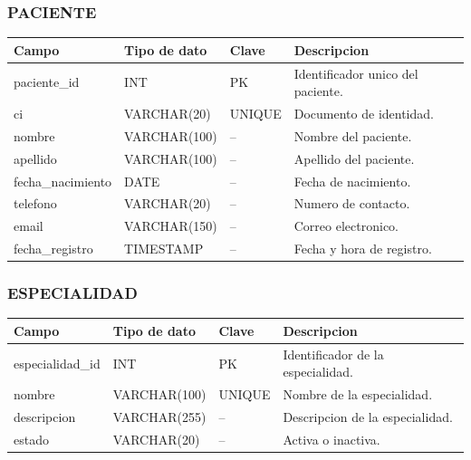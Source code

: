 \documentclass[11pt,letterpaper]{article}
\begin{document}
\subsubsection*{PACIENTE}
\begin{center}
\small
\begin{tabularx}{\textwidth}{@{}p{3.2cm}p{3cm}p{2cm}Y@{}}
  \toprule
  \textbf{Campo} & \textbf{Tipo de dato} & \textbf{Clave} & \textbf{Descripcion} \\
  \midrule
  paciente\_id & INT & PK & Identificador unico del paciente. \\
  ci & VARCHAR(20) & UNIQUE & Documento de identidad. \\
  nombre & VARCHAR(100) & -- & Nombre del paciente. \\
  apellido & VARCHAR(100) & -- & Apellido del paciente. \\
  fecha\_nacimiento & DATE & -- & Fecha de nacimiento. \\
  telefono & VARCHAR(20) & -- & Numero de contacto. \\
  email & VARCHAR(150) & -- & Correo electronico. \\
  fecha\_registro & TIMESTAMP & -- & Fecha y hora de registro. \\
  \bottomrule
\end{tabularx}
\end{center}

\subsubsection*{ESPECIALIDAD}
\begin{center}
\small
\begin{tabularx}{\textwidth}{@{}p{3.2cm}p{3cm}p{2cm}Y@{}}
  \toprule
  \textbf{Campo} & \textbf{Tipo de dato} & \textbf{Clave} & \textbf{Descripcion} \\
  \midrule
  especialidad\_id & INT & PK & Identificador de la especialidad. \\
  nombre & VARCHAR(100) & UNIQUE & Nombre de la especialidad. \\
  descripcion & VARCHAR(255) & -- & Descripcion de la especialidad. \\
  estado & VARCHAR(20) & -- & Activa o inactiva. \\
  \bottomrule
\end{tabularx}
\end{center}
\end{document}
